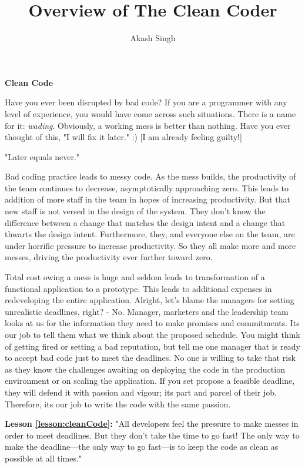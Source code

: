 \documentclass[12pt]{article}
\title{Overview of The Clean Coder}
\author{Akash Singh}
\affil{School of Computer Science, McGill University, Montreal, Canada}
\date{}
\newcounter{lessoncounter}
\newcommand{\lesson}[1]{\refstepcounter{lessoncounter}\label{#1}}
\begin{document}
\maketitle
{\Large \textbf{Clean Code}\par}


Have you ever been disrupted by bad code? If you are a programmer with any level of experience, you would have come across such situations. There is a name for it: \textit{wading}. Obviously, a working mess is better than nothing. Have you ever thought of this, "I will fix it later." :) [I am already feeling guilty!]

"Later equals never."

Bad coding practice leads to messy code. As the mess builds, the productivity of the team continues to decrease, asymptotically approaching zero. This leads to addition of more staff in the team in hopes of increasing productivity. But that new staff is not versed in the design of the system. They don’t know the difference between a change that matches the design intent and a change that thwarts the design intent. Furthermore, they, and everyone else on the team, are under horrific pressure to increase productivity. So they all make more and more messes, driving the productivity ever further toward zero.

Total cost owing a mess is huge and seldom leads to transformation of a functional application to a prototype. This leads to additional expenses in redeveloping the entire application. Alright, let's blame the managers for setting unrealistic deadlines, right? - No. Manager, marketers and the leadership team looks at us for the information they need to make promises and commitments. Its our job to tell them what we think about the proposed schedule. You might think of getting fired or setting a bad reputation, but tell me one manager that is ready to accept bad code just to meet the deadlines. No one is willing to take that risk as they know the challenges awaiting on deploying the code in the production environment or on scaling the application. If you set propose a feasible deadline, they will defend it with passion and vigour; its part and parcel of their job. Therefore, its our job to write the code with the same passion.
\begin{myquote}
\lesson{lesson:cleanCode}
\textbf{Lesson \ref{lesson:cleanCode}:} "All developers feel the pressure to make messes in order to meet deadlines. But they don’t take the time to go fast! The only way to make the deadline—the only way to go fast—is to keep the code as clean as possible at all times."
\end{myquote}
\end{document}
